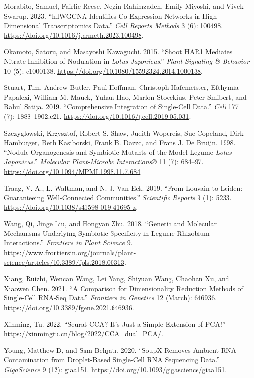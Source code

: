 \documentclass[
  letterpaper,
  DIV=11,
  numbers=noendperiod]{scrartcl}
\newlength{\cslhangindent}
\newlength{\cslentryspacingunit} %
\newenvironment{CSLReferences}[2] %
 {%
  \setlength{\parindent}{0pt}
  \ifodd #1
  \let\oldpar\par
  \def\par{\hangindent=\cslhangindent\oldpar}
  \fi
  \setlength{\parskip}{#2\cslentryspacingunit}
 }%
 {}
\begin{document}
\begin{CSLReferences}{1}{0}
\leavevmode{}%
Morabito, Samuel, Fairlie Reese, Negin Rahimzadeh, Emily Miyoshi, and
Vivek Swarup. 2023. {``{hdWGCNA} Identifies Co-Expression Networks in
High-Dimensional Transcriptomics Data.''} \emph{Cell Reports Methods} 3
(6): 100498. \url{https://doi.org/10.1016/j.crmeth.2023.100498}.

\leavevmode{}%
Okamoto, Satoru, and Masayoshi Kawaguchi. 2015. {``Shoot {HAR}1 Mediates
Nitrate Inhibition of Nodulation in \emph{Lotus Japonicus}.''}
\emph{Plant Signaling \& Behavior} 10 (5): e1000138.
\url{https://doi.org/10.1080/15592324.2014.1000138}.

\leavevmode{}%
Stuart, Tim, Andrew Butler, Paul Hoffman, Christoph Hafemeister,
Efthymia Papalexi, William M. Mauck, Yuhan Hao, Marlon Stoeckius, Peter
Smibert, and Rahul Satija. 2019. {``Comprehensive {Integration} of
{Single}-{Cell} {Data}.''} \emph{Cell} 177 (7): 1888--1902.e21.
\url{https://doi.org/10.1016/j.cell.2019.05.031}.

\leavevmode{}%
Szczyglowski, Krzysztof, Robert S. Shaw, Judith Wopereis, Sue Copeland,
Dirk Hamburger, Beth Kasiborski, Frank B. Dazzo, and Frans J. De Bruijn.
1998. {``Nodule Organogenesis and Symbiotic Mutants of the Model Legume
\emph{Lotus Japonicus}.''} \emph{Molecular Plant-Microbe Interactions®}
11 (7): 684--97. \url{https://doi.org/10.1094/MPMI.1998.11.7.684}.

\leavevmode{}%
Traag, V. A., L. Waltman, and N. J. Van Eck. 2019. {``From {Louvain} to
{Leiden}: Guaranteeing Well-Connected Communities.''} \emph{Scientific
Reports} 9 (1): 5233. \url{https://doi.org/10.1038/s41598-019-41695-z}.

\leavevmode{}%
Wang, Qi, Jinge Liu, and Hongyan Zhu. 2018. {``Genetic and Molecular
Mechanisms Underlying Symbiotic Specificity in Legume-Rhizobium
Interactions.''} \emph{Frontiers in Plant Science} 9.
\url{https://www.frontiersin.org/journals/plant-science/articles/10.3389/fpls.2018.00313}.

\leavevmode{}%
Xiang, Ruizhi, Wencan Wang, Lei Yang, Shiyuan Wang, Chaohan Xu, and
Xiaowen Chen. 2021. {``A {Comparison} for {Dimensionality} {Reduction}
{Methods} of {Single}-{Cell} {RNA}-Seq {Data}.''} \emph{Frontiers in
Genetics} 12 (March): 646936.
\url{https://doi.org/10.3389/fgene.2021.646936}.

\leavevmode{}%
Xinming, Tu. 2022. {``Seurat {CCA}? {It}'s Just a Simple Extension of
{PCA}!''} \url{https://xinmingtu.cn/blog/2022/CCA_dual_PCA/}.

\leavevmode{}%
Young, Matthew D, and Sam Behjati. 2020. {``{SoupX} Removes Ambient
{RNA} Contamination from Droplet-Based Single-Cell {RNA} Sequencing
Data.''} \emph{GigaScience} 9 (12): giaa151.
\url{https://doi.org/10.1093/gigascience/giaa151}.

\end{CSLReferences}
\end{document}
